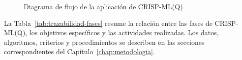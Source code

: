 \begin{figure}[!htbp]
\caption{Diagrama de flujo de la aplicación de CRISP-ML(Q)}
\label{fig:flujo-crispmlq}
\centering


\par\smallskip
\begin{minipage}{0.9\textwidth}
\footnotesize
\par{}
\end{minipage}

\end{figure}



La Tabla~\ref{tab:trazabilidad-fases} resume la relación entre las fases de CRISP-ML(Q), los objetivos específicos y las actividades realizadas. Los datos, algoritmos, criterios y procedimientos se describen en las secciones correspondientes del Capítulo~\ref{chap:metodologia}.

